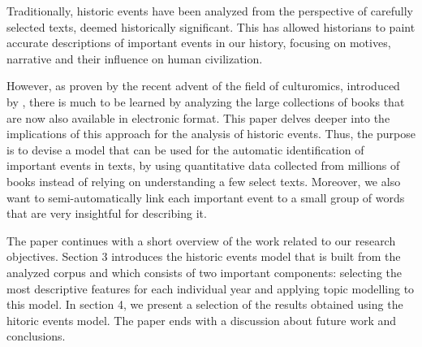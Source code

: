 
Traditionally, historic events have been analyzed from the perspective of carefully selected texts, deemed historically significant. This has allowed historians to paint accurate descriptions of important events in our history, focusing on motives, narrative and their influence on human civilization.

However, as proven by the recent advent of the field of culturomics, introduced by , there is much to be learned by analyzing the large collections of books that are now also available in electronic format. This paper delves deeper into the implications of this approach for the analysis of historic events. Thus, the purpose is to devise a model that can be used for the automatic identification of important events in texts, by using quantitative data collected from millions of books instead of relying on understanding a few select texts. Moreover, we also want to semi-automatically link each important event to a small group of words that are very insightful for describing it.

The paper continues with a short overview of the work related to our research objectives. Section 3 introduces the historic events model that is built from the analyzed corpus and which consists of two important components: selecting the most descriptive features for each individual year and applying topic modelling to this model. In section 4, we present a selection of the results obtained using the hitoric events model. The paper ends with a discussion about future work and conclusions.
